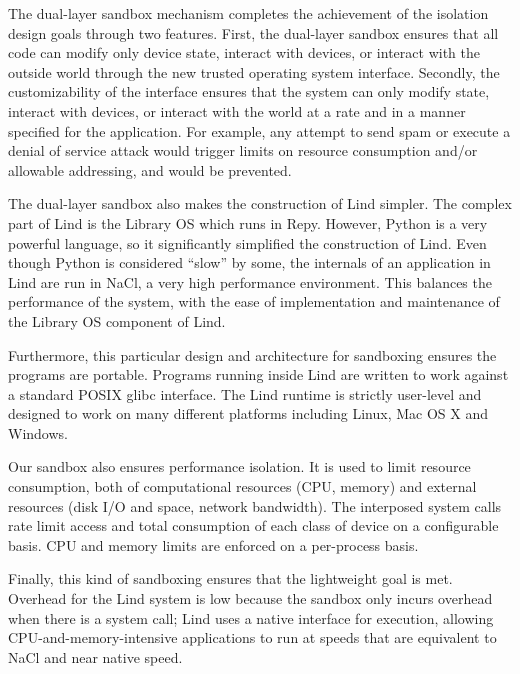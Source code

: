 The dual-layer sandbox mechanism completes the achievement of the isolation design goals through 
two features. First, the dual-layer sandbox ensures that all code can modify only device state, 
interact with devices, or interact with the outside world through the new trusted operating system interface. 
Secondly, the customizability of the interface ensures that the system can only modify state, interact with 
devices, or interact with the world at a rate and in a manner specified for the application. For example, 
any attempt to send spam or execute a denial of service attack would trigger limits on resource 
consumption and/or allowable addressing, and would be prevented. 

The dual-layer sandbox also makes the construction of Lind simpler. The complex part of Lind is the 
Library OS which runs in Repy. However, Python is a very powerful language, so it significantly simplified 
the construction of Lind. Even though Python is considered ``slow'' by some, the internals of 
an application in Lind are run in NaCl, a very high performance environment. 
This balances the performance of the system, with the ease of implementation and maintenance 
of the Library OS component of Lind. 

Furthermore, this particular design and architecture for sandboxing ensures the programs are portable. 
Programs running inside Lind are written to work against a standard POSIX glibc interface. 
The Lind runtime is strictly user-level and designed to work on many different platforms including Linux, 
Mac OS X and Windows.

Our sandbox also ensures performance isolation. It is used to limit resource consumption, 
both of computational resources (CPU, memory) and external resources (disk I/O and space, 
network bandwidth). The interposed system calls rate limit access and total consumption of 
each class of device on a configurable basis. CPU and memory limits are enforced on 
a per-process basis. 

Finally, this kind of sandboxing ensures that the lightweight goal is met. Overhead for the Lind system 
is low because the sandbox only incurs overhead when there is a system call; Lind uses a native interface 
for execution, allowing CPU-and-memory-intensive applications to run at speeds that are equivalent 
to NaCl and near native speed. 

